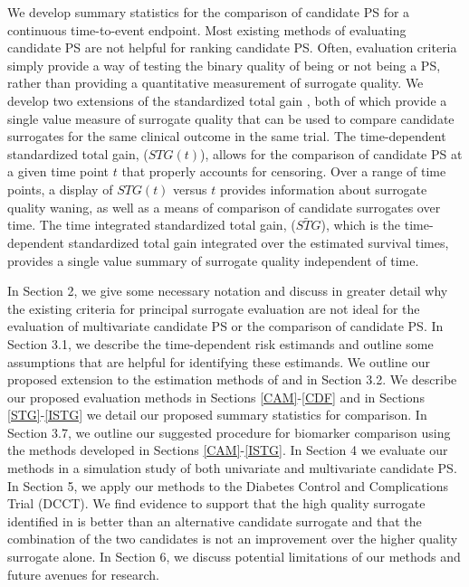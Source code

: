 \documentclass[times, doublespace]{simauth}
\begin{document}
We develop summary statistics for the comparison of candidate PS for a continuous time-to-event endpoint. Most existing methods of evaluating candidate PS are not helpful for ranking candidate PS. Often, evaluation criteria simply provide a way of testing the binary quality of being or not being a PS, rather than providing a quantitative measurement of surrogate quality. We develop two extensions of the standardized total gain \citep{Huang11}, both of which provide a single value measure of surrogate quality that can be used to compare candidate surrogates for the same clinical outcome in the same trial. The time-dependent standardized total gain, ($STG(t)$), allows for the comparison of candidate PS at a given time point $t$ that properly accounts for censoring. Over a range of time points, a display of $STG(t)$ versus $t$ provides information about surrogate quality waning, as well as a means of comparison of candidate surrogates over time. The time integrated  standardized total gain, ($\widetilde{STG}$), which is the time-dependent standardized total gain integrated over the estimated survival times, provides a single value summary of surrogate quality independent of time. 

In Section 2, we give some necessary notation and discuss in greater detail why the existing criteria for principal surrogate evaluation are not ideal for the evaluation of multivariate candidate PS or the comparison of candidate PS.  In Section 3.1, we describe the time-dependent risk estimands and outline some assumptions that are helpful for identifying these estimands.  We outline our proposed extension to the estimation methods of \citet{Huang11} and \citet{Gabriel13} in Section 3.2.  We describe our proposed evaluation methods in Sections \ref{CAM}-\ref{CDF} and in Sections \ref{STG}-\ref{ISTG} we detail our proposed summary statistics for comparison. In Section 3.7, we outline our suggested procedure for biomarker comparison using the methods developed in Sections \ref{CAM}-\ref{ISTG}. In Section 4 we evaluate our methods in a simulation study of both univariate and multivariate candidate PS. In Section 5, we apply our methods to the Diabetes Control and Complications Trial (DCCT). We find evidence to support that the high quality surrogate identified in \citet{Gabriel13} is better than an alternative candidate surrogate and that the combination of the two candidates is not an improvement over the higher quality surrogate alone. In Section 6, we discuss potential limitations of our methods and future avenues for research. 
\end{document}
